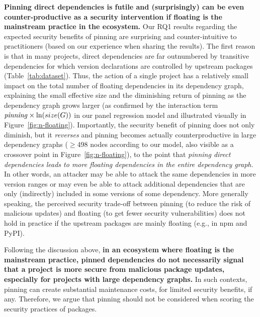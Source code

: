 \textbf{Pinning direct dependencies is futile and (surprisingly) can be even counter-productive as a security intervention if floating is the mainstream practice in the ecosystem.}
Our RQ1 results regarding the expected security benefits of pinning are surprising and counter-intuitive to practitioners (based on our experience when sharing the results).
The first reason is that in many projects, direct dependencies are far outnumbered by transitive dependencies for which version declarations are controlled by upstream packages (Table~\ref{tab:dataset}). 
Thus, the action of a single project has a relatively small impact on the total number of floating dependencies in its dependency graph, explaining the small effective size and the diminishing return of pinning as the dependency graph grows larger (as confirmed by the interaction term $\text{\emph{pinning}} \times \ln(size(G))$ in our panel regression model and illustrated visually in Figure~\ref{fig:n-floating}).
Importantly, the security benefit of pinning does not only diminish, but it \textit{reverses} and pinning becomes actually counterproductive in large dependency graphs ($\ge$498 nodes according to our model, also visible as a crossover point in Figure~\ref{fig:n-floating}), to the point that \textit{pinning direct dependencies leads to more floating dependencies in the entire dependency graph.}  
In other words, an attacker may be able to attack the same dependencies in more version ranges or may even be able to attack additional dependencies that are only (indirectly) included in some versions of some dependency.
More generally speaking, the perceived security trade-off between pinning (to reduce the risk of malicious updates) and floating (to get fewer security vulnerabilities) does not hold in practice if the upstream packages are mainly floating (e.g., in npm and PyPI). 

Following the discussion above, \textbf{in an ecosystem where floating is the mainstream practice, pinned dependencies do not necessarily signal that a project is more secure from malicious package updates, especially for projects with large dependency graphs.}
In such contexts, pinning can create substantial maintenance costs, for limited security benefits, if any. 
Therefore, we argue that pinning should not be considered when scoring the security practices of packages.


